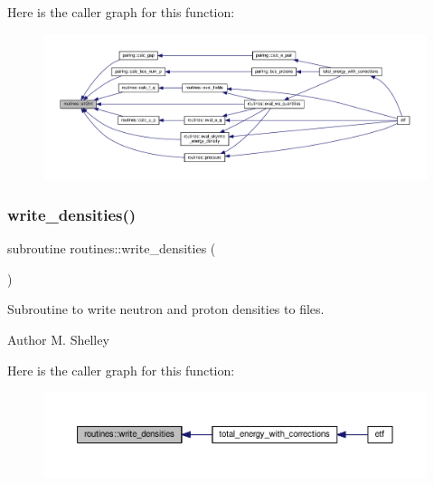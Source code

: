Here is the caller graph for this function\+:
\nopagebreak
\begin{figure}[H]
\begin{center}
\leavevmode
\includegraphics[width=350pt]{namespaceroutines_a8146fb4359e556bad19f882b8aabfc4b_icgraph}
\end{center}
\end{figure}
\mbox{\label{namespaceroutines_a81e61269fb96b5478fd7140a1f185ec1}} 
\subsubsection{\texorpdfstring{write\+\_\+densities()}{write\_densities()}}
{\footnotesize\ttfamily subroutine routines\+::write\+\_\+densities (\begin{DoxyParamCaption}{ }\end{DoxyParamCaption})}



Subroutine to write neutron and proton densities to files. 

\begin{DoxyAuthor}{Author}
M. Shelley 
\end{DoxyAuthor}
Here is the caller graph for this function\+:
\nopagebreak
\begin{figure}[H]
\begin{center}
\leavevmode
\includegraphics[width=350pt]{namespaceroutines_a81e61269fb96b5478fd7140a1f185ec1_icgraph}
\end{center}
\end{figure}
\mbox{\label{namespaceroutines_a4a59953c814b7fa48f2c4bf31d1763a2}} 
